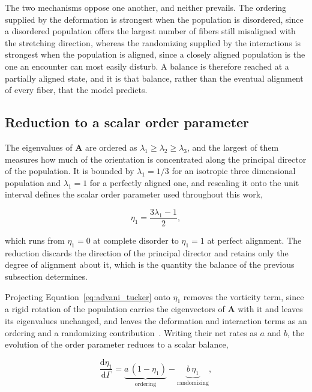 \documentclass[%
  aip,
  pof,          %
  reprint,      %
  floatfix
]{revtex4-2}
\begin{document}
The two mechanisms oppose one another, and neither prevails. The ordering supplied by the deformation is strongest when the population is disordered, since a disordered population offers the largest number of fibers still misaligned with the stretching direction, whereas the randomizing supplied by the interactions is strongest when the population is aligned, since a closely aligned population is the one an encounter can most easily disturb. A balance is therefore reached at a partially aligned state, and it is that balance, rather than the eventual alignment of every fiber, that the model predicts.

\subsection{Reduction to a scalar order parameter}
\label{sec:governing_reduction}

The eigenvalues of $\bm{A}$ are ordered as $\lambda_1 \geq \lambda_2 \geq \lambda_3$, and the largest of them measures how much of the orientation is concentrated along the principal director of the population. It is bounded by $\lambda_1 = 1/3$ for an isotropic three dimensional population and $\lambda_1 = 1$ for a perfectly aligned one, and rescaling it onto the unit interval defines the scalar order parameter used throughout this work,

\begin{equation}
    \eta_1 = \frac{3\lambda_1 - 1}{2},
    \label{eq:eta_1}
\end{equation}

which runs from $\eta_1 = 0$ at complete disorder to $\eta_1 = 1$ at perfect alignment. The reduction discards the direction of the principal director and retains only the degree of alignment about it, which is the quantity the balance of the previous subsection determines.

Projecting Equation~\eqref{eq:advani_tucker} onto $\eta_1$ removes the vorticity term, since a rigid rotation of the population carries the eigenvectors of $\bm{A}$ with it and leaves its eigenvalues unchanged, and leaves the deformation and interaction terms as an ordering and a randomizing contribution~\cite{advani1987use,doi1986theory}. Writing their net rates as $a$ and $b$, the evolution of the order parameter reduces to a scalar balance,

\begin{equation}
    \frac{\mathrm{d}\eta_1}{\mathrm{d}\Gamma} = \underbrace{a\,(1 - \eta_1)}_{\text{ordering}} - \underbrace{b\,\eta_1}_{\text{randomizing}},
    \label{eq:balance}
\end{equation}
\end{document}
